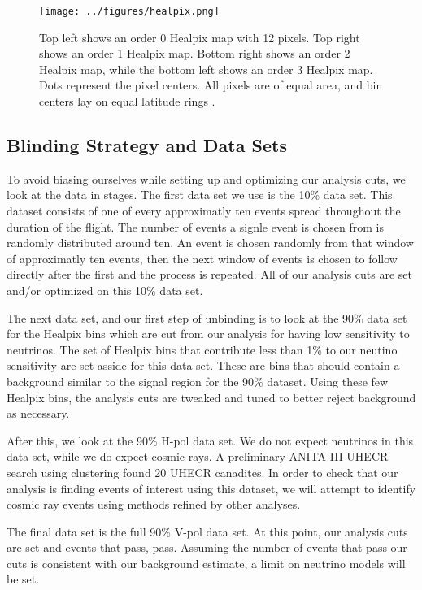 \begin{figure}[h]
\centering
\texttt{[image: ../figures/healpix.png]}
\caption[Healpix Map]{Top left shows an order 0 Healpix map with 12 pixels.  Top right shows an order 1 Healpix map.  Bottom right shows an order 2 Healpix map, while the bottom left shows an order 3 Healpix map.  Dots represent the pixel centers.  All pixels are of equal area, and bin centers lay on equal latitude rings \cite{Healpix}.}
\label{fig:healpix}
\end{figure}
 
\subsection{Blinding Strategy and Data Sets}
To avoid biasing ourselves while setting up and optimizing our analysis cuts, we look at the data in stages.  
The first data set we use is the 10\% data set.  This dataset consists of one of every approximatly ten events spread throughout the duration of the flight.  The number of events a signle event is chosen from is randomly distributed around ten.  An event is chosen randomly from that window of approximatly ten events, then the next window of events is chosen to follow directly after the first and the process is repeated.  All of our analysis cuts are set and/or optimized on this 10\% data set.
  
The next data set, and our first step of unbinding is to look at the 90\% data set for the Healpix bins which are cut from our analysis for having low sensitivity to neutrinos.  The set of Healpix bins that contribute less than 1\% to our neutino sensitivity are set asside for this data set.  These are bins that should contain a background similar to the signal region for the 90\% dataset.  Using these few Healpix bins, the analysis cuts are tweaked and tuned to better reject background as necessary.

After this, we look at the 90\% H-pol data set.  We do not expect neutrinos in this data set, while we do expect cosmic rays.  A preliminary ANITA-III UHECR search using clustering found 20 UHECR canadites.  In order to check that our analysis is finding events of interest using this dataset, we will attempt to identify cosmic ray events using methods refined by other analyses. 

The final data set is the full 90\% V-pol data set.  At this point, our analysis cuts are set and events that pass, pass.  Assuming the number of events that pass our cuts is consistent with our background estimate, a limit on neutrino models will be set.  

